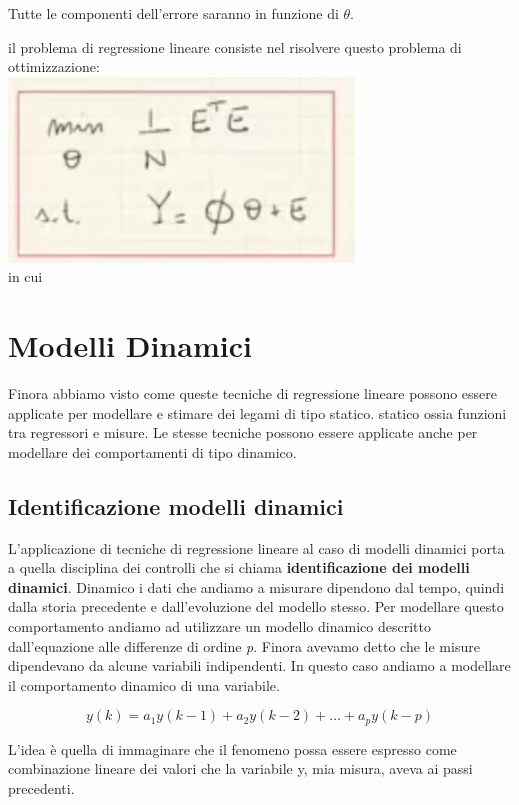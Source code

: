 \documentclass[10pt,a4paper]{article}
\begin{document}
Tutte le componenti dell'errore saranno in funzione di $ \theta $.

il problema di regressione lineare consiste nel risolvere questo problema di ottimizzazione:\\
\includegraphics[scale=0.41]{err.png} \\
in cui 





\section{Modelli Dinamici}
Finora abbiamo visto come queste tecniche di regressione lineare possono essere applicate per modellare e stimare dei legami di tipo statico. statico ossia funzioni tra regressori e misure.
Le stesse tecniche possono essere applicate anche per modellare dei comportamenti di tipo dinamico.
\subsection{Identificazione modelli dinamici}
L'applicazione di tecniche di regressione lineare al caso di modelli dinamici porta a quella disciplina dei controlli che si chiama \textbf{identificazione dei modelli dinamici}. Dinamico i dati che andiamo a misurare dipendono dal tempo, quindi dalla storia precedente e dall'evoluzione del modello stesso. 
Per modellare questo comportamento andiamo ad utilizzare un modello dinamico descritto dall'equazione alle differenze di ordine \textit{p}.
Finora avevamo detto che le misure dipendevano da alcune variabili indipendenti. In questo caso andiamo a modellare il comportamento dinamico di una variabile.

\begin{equation}
y(k)=a_{1}y(k-1)+a_{2}y(k-2)+...+a_{p}y(k-p)
\end{equation}

L'idea è quella di immaginare che il fenomeno possa essere espresso come combinazione lineare dei valori che la variabile y, mia misura, aveva ai passi precedenti.
\end{document}
